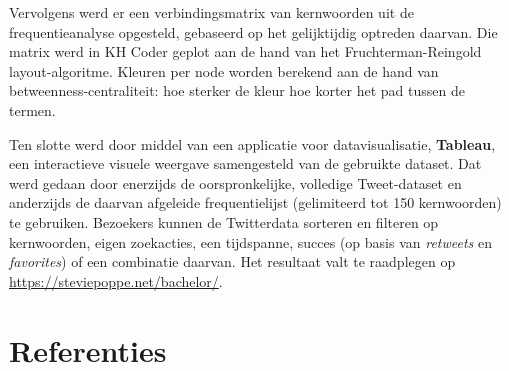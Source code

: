\documentclass[10.5pt,dutch,]{article}
\begin{document}
Vervolgens werd er een verbindingsmatrix van kernwoorden uit de
frequentieanalyse opgesteld, gebaseerd op het gelijktijdig optreden
daarvan. Die matrix werd in KH Coder geplot aan de hand van het
Fruchterman-Reingold layout-algoritme. Kleuren per node worden berekend
aan de hand van betweenness-centraliteit: hoe sterker de kleur hoe
korter het pad tussen de termen.

Ten slotte werd door middel van een applicatie voor datavisualisatie, \textbf{Tableau}, een interactieve
visuele weergave samengesteld van de gebruikte dataset. Dat werd gedaan
door enerzijds de oorspronkelijke, volledige Tweet-dataset en anderzijds
de daarvan afgeleide frequentielijst (gelimiteerd tot 150 kernwoorden)
te gebruiken. Bezoekers kunnen de Twitterdata sorteren en filteren op
kernwoorden, eigen zoekacties, een tijdspanne, succes (op basis van
\emph{retweets} en \emph{favorites}) of een combinatie daarvan. Het
resultaat valt te raadplegen op \url{https://steviepoppe.net/bachelor/}.


\newpage

\section*{Referenties}

\setlength{\parindent}{-0.2in} \setlength{\leftskip}{0.2in}
\setlength{\parskip}{0em} \noindent
\end{document}
